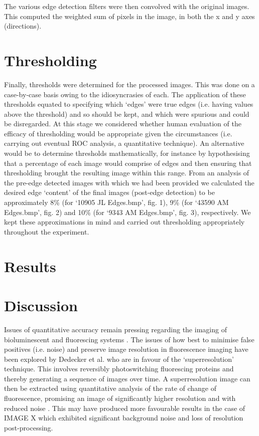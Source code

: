\documentclass[a4paper]{article}
\begin{document}
\begin{multicols*}{2}
The various edge detection filters were then convolved with the original images. This computed the weighted sum of pixels in the image, in both the x and y axes (directions).

\section*{Thresholding}

Finally, thresholds were determined for the processed images. This was done on a case-by-case basis owing to the idiosyncrasies of each. The application of these thresholds equated to specifying which ‘edges’ were true edges (i.e. having values above the threshold) and so should be kept, and which were spurious and could be disregarded. At this stage we considered whether human evaluation of the efficacy of thresholding would be appropriate given the circumstances (i.e. carrying out eventual ROC analysis, a quantitative technique). An alternative would be to determine thresholds mathematically, for instance by hypothesising that a percentage of each image would comprise of edges and then ensuring that thresholding brought the resulting image within this range. From an analysis of the pre-edge detected images with which we had been provided we calculated the desired edge ‘content’ of the final images (post-edge detection) to be approximately 8\% (for ‘10905 JL Edges.bmp’, fig. 1), 9\% (for ‘43590 AM Edges.bmp’, fig. 2) and 10\% (for ‘9343 AM Edges.bmp’, fig. 3), respectively. We kept these approximations in mind and carried out thresholding appropriately throughout the experiment.

\section*{Results}

\section*{Discussion}

Issues of quantitative accuracy remain pressing regarding the imaging of bioluminescent and fluorescing systems \citep{taylor2015accounting}. 
The issues of how best to minimise false positives (i.e. noise) and preserve image resolution in fluorescence imaging have been explored by Dedecker et al. who are in favour of the ‘superresolution’ technique. This involves reversibly photoswitching fluorescing proteins and thereby generating a sequence of images over time. A superresolution image can then be extracted using quantitative analysis of the rate of change of fluorescence, promising an image of significantly higher resolution and with reduced noise \citep{dedecker2012widely}. This may have produced more favourable results in the case of IMAGE X which exhibited significant background noise and loss of resolution post-processing.


\end{multicols*}
\end{document}
